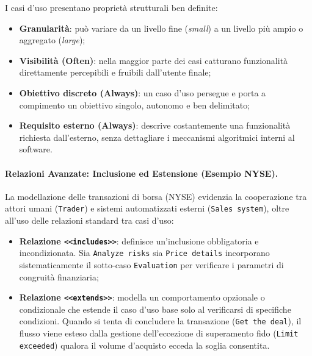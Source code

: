 \documentclass[12pt]{extarticle}
\begin{document}
\noindent I casi d'uso presentano proprietà strutturali ben definite:
\begin{itemize}
    \item \textbf{Granularità}: può variare da un livello fine (\textit{small}) a un livello più ampio o aggregato (\textit{large});
    \item \textbf{Visibilità (Often)}: nella maggior parte dei casi catturano funzionalità direttamente percepibili e fruibili dall'utente finale;
    \item \textbf{Obiettivo discreto (Always)}: un caso d'uso persegue e porta a compimento un obiettivo singolo, autonomo e ben delimitato;
    \item \textbf{Requisito esterno (Always)}: descrive costantemente una funzionalità richiesta dall'esterno, senza dettagliare i meccanismi algoritmici interni al software.
\end{itemize}

\paragraph{Relazioni Avanzate: Inclusione ed Estensione (Esempio NYSE).}
La modellazione delle transazioni di borsa (NYSE) evidenzia la cooperazione tra attori umani (\texttt{Trader}) e sistemi automatizzati esterni (\texttt{Sales system}), oltre all'uso delle relazioni standard tra casi d'uso:
\begin{itemize}
    \item \textbf{Relazione \texttt{<<includes>>}}: definisce un'inclusione obbligatoria e incondizionata. Sia \texttt{Analyze risks} sia \texttt{Price details} incorporano sistematicamente il sotto-caso \texttt{Evaluation} per verificare i parametri di congruità finanziaria;
    \item \textbf{Relazione \texttt{<<extends>>}}: modella un comportamento opzionale o condizionale che estende il caso d'uso base solo al verificarsi di specifiche condizioni. Quando si tenta di concludere la transazione (\texttt{Get the deal}), il flusso viene esteso dalla gestione dell'eccezione di superamento fido (\texttt{Limit exceeded}) qualora il volume d'acquisto ecceda la soglia consentita.
\end{itemize}
\end{document}

